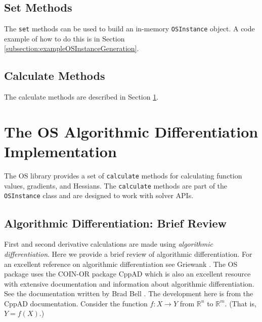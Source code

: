 \documentclass[11pt]{article}
\renewcommand{\_}{{\char"5F}}
\renewcommand{\{}{{\char"7B}}
\renewcommand{\}}{{\char"7D}}
\renewcommand{\^}{{\char"0D}}
\renewcommand{\'}{{\char"0D}}
\begin{document}
\subsection{Set Methods}

The {\tt set} methods can be used to build an in-memory {\tt OSInstance}
 object. A code example of how to do this is in Section \ref{subsection:exampleOSInstanceGeneration}.

\subsection{Calculate Methods}

The calculate methods are described in Section \ref{section:ad}.

\section{The OS Algorithmic Differentiation Implementation}\label{section:ad}

The OS library provides a set of {\tt calculate} methods for calculating  function values, gradients, and Hessians.     The {\tt calculate} methods are part of the {\tt OSInstance} class and are designed to work with solver APIs.



\subsection{Algorithmic Differentiation:  Brief Review}\label{section:adtheory}

First and second derivative calculations are made using {\it  algorithmic differentiation}.  Here we provide a brief review of algorithmic differentiation.  For an excellent reference on algorithmic differentiation see Griewank \cite{griewank2000}.  The OS package uses the COIN-OR package CppAD which  is also an excellent resource with extensive  documentation and information about algorithmic differentiation. See the documentation written by  Brad Bell \cite{bell2007}.    The development here is from the CppAD documentation.  Consider the function $f:X \rightarrow Y$ from $ \mathbb{R}^{n}$ to $ \mathbb{R}^{m}.$ (That is, $Y = f(X).$)
\end{document}
